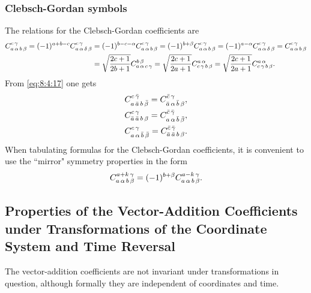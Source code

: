 \subsubsection{Clebsch-Gordan symbols}
The relations for the Clebsch-Gordan coefficients are
\begin{align}
C_{a\,\alpha\,b\,\beta}^{c\,\gamma}=(-1)^{a+b-c} C_{a\,\alpha\,\delta\,\beta}^{c\,\gamma} & =(-1)^{b-c-\alpha} C_{a\,\alpha\,b\,\beta}^{c\,\gamma}=(-1)^{b+\beta} C_{a\,\alpha\,b\,\beta}^{c\,\gamma}=(-1)^{a-\alpha} C_{a\,\alpha\,\delta\,\beta}^{c\,\gamma}=C_{a\,\alpha\,b\,\beta}^{c\,\gamma}  \notag\\
& =\sqrt{\frac{2 c+1}{2 b+1}} C_{a\,\alpha\,c\,\gamma}^{b\,\beta}=\sqrt{\frac{2 c+1}{2 a+1}} C_{c\,\gamma\,b\,\beta}^{a\,\alpha}=\sqrt{\frac{2 c+1}{2 a+1}} C_{c\,\gamma\,b\,\beta}^{a\,\alpha}. \label{eq:8:4:17}
\end{align}
From \eqref{eq:8:4:17} one gets
\begin{align}
& C_{a\,\bar{a}\,b\,\bar{\beta}}^{c\,\bar{\gamma}}=C_{\bar{a}\,\alpha\,\bar{b}\,\beta}^{\bar{c}\,\gamma}, \label{eq:8:4:18}\\
& C_{\bar{a}\,\bar{a}\,b\,\beta}^{c\,\gamma}=C_{a\,\alpha\,\bar{b}\,\bar{\beta}}^{\bar{c}\,\bar{\gamma}}, \label{eq:8:4:19}\\
& C_{a\,\alpha\,\bar{b}\,\bar{\beta}}^{c\,\gamma}=C_{\bar{a}\,\bar{a}\,b\,\beta}^{\bar{c}\,\bar{\gamma}}. \label{eq:8:4:20}
\end{align}
When tabulating formulas for the Clebsch-Gordan coefficients, it is convenient to use the ``mirror" symmetry properties in the form
\begin{equation}
C_{a\,\alpha\,b\,\beta}^{a+k\,\gamma}=(-1)^{b+\beta} C_{a\,\alpha\,b\,\beta}^{a-k\,\gamma}. \label{eq:8:4:21}
\end{equation}
\subsection{Properties of the Vector-Addition Coefficients under Transformations of the Coordinate System and Time Reversal}\label{sec:8.4.5}
The vector-addition coefficients are not invariant under transformations in question, although formally they are independent of coordinates and time.

